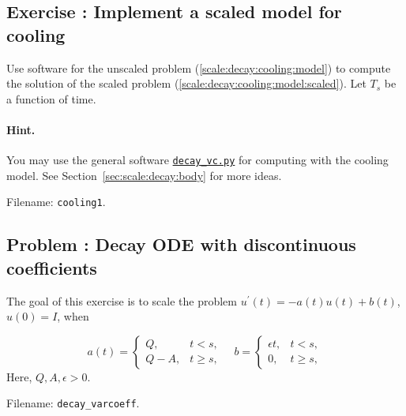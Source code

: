 \documentclass[graybox,envcountchap,sectrefs,final]{svmonodo}
\newcounter{doconce:movie:counter}
\newenvironment{doconceexercise}{}{}
\newcounter{doconceexercisecounter}
\begin{document}
\begin{doconceexercise}

\subsection*{Exercise \thedoconceexercisecounter: Implement a scaled model for cooling}

\label{sec:scale:exer:decay:cooling}

Use software for the unscaled problem (\ref{scale:decay:cooling:model})
to compute the solution of the
scaled problem (\ref{scale:decay:cooling:model:scaled}).
Let $T_s$ be a function of time.


\paragraph{Hint.}
You may use the general software \href{{http://tinyurl.com/o8pb3yy/decay_vc.py}}{\nolinkurl{decay_vc.py}}
for computing with the cooling model.
See Section~\ref{sec:scale:decay:body} for more ideas.



\noindent Filename: \texttt{cooling1}.

\end{doconceexercise}




\begin{doconceexercise}

\subsection*{Problem \thedoconceexercisecounter: Decay ODE with discontinuous coefficients}

\label{scale:decay:exer:decay:step}

The goal of this exercise is to scale the problem
$u^{\prime}(t) = -a(t)u(t) + b(t)$, $u(0)=I$, when

\[
a(t) =\left\lbrace\begin{array}{ll}
Q, & t < s,\\ 
Q - A, & t\geq s,\end{array}\right.
\quad b = \left\lbrace\begin{array}{ll}
\epsilon t, & t < s,\\ 
0, & t\geq s,\end{array}\right.
\]
Here, $Q,A,\epsilon >0$.


\noindent Filename: \Verb!decay_varcoeff!.

\end{doconceexercise}
\end{document}
